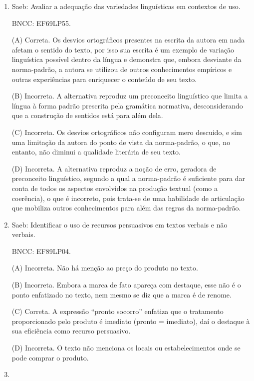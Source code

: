 \begin{enumerate}

\item

Saeb: Avaliar a adequação das variedades linguísticas em contextos de
uso.

BNCC: EF69LP55.

(A) Correta. Os desvios ortográficos presentes na escrita da autora em
nada afetam o sentido do texto, por isso sua escrita é um exemplo de
variação linguística possível dentro da língua e demonstra que, embora
desviante da norma-padrão, a autora se utilizou de outros conhecimentos
empíricos e outras experiências para enriquecer o conteúdo de seu texto.

(B) Incorreta. A alternativa reproduz um preconceito linguístico que
limita a língua à forma padrão prescrita pela gramática normativa,
desconsiderando que a construção de sentidos está para além dela.

(C) Incorreta. Os desvios ortográficos não configuram mero descuido, e
sim uma limitação da autora do ponto de vista da norma-padrão, o que, no
entanto, não diminui a qualidade literária de seu texto.

(D) Incorreta. A alternativa reproduz a noção de erro, geradora de
preconceito linguístico, segundo a qual a norma-padrão é suficiente para
dar conta de todos os aspectos envolvidos na produção textual (como a
coerência), o que é incorreto, pois trata-se de uma habilidade de
articulação que mobiliza outros conhecimentos para além das regras da
norma-padrão.

\item

Saeb: Identificar o uso de recursos persuasivos em textos verbais e não
verbais.

BNCC: EF89LP04.

(A) Incorreta. Não há menção ao preço do produto no texto.

(B) Incorreta. Embora a marca de fato apareça com destaque, esse não é o
ponto enfatizado no texto, nem mesmo se diz que a marca é de renome.

(C) Correta. A expressão ``pronto socorro'' enfatiza que o tratamento
proporcionado pelo produto é imediato (pronto = imediato), daí o
destaque à sua eficiência como recurso persuasivo.

(D) Incorreta. O texto não menciona os locais ou estabelecimentos onde
se pode comprar o produto.


\item


\end{enumerate}
